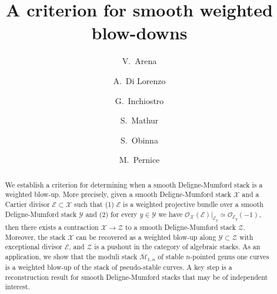 \documentclass{amsart}
\newcommand{\cE}{\mathcal{E}}
\newcommand{\cO}{\mathcal{O}}
\newcommand{\cX}{\mathcal{X}}
\newcommand{\cY}{\mathcal{Y}}
\newcommand{\cZ}{\mathcal{Z}}
\theoremstyle{definition}
\begin{document}
\title{A criterion for smooth weighted blow-downs}
\author[V.~Arena]{V.~Arena}
\address[Veronica Arena]{DPMMS, University of Cambridge, UK}
\author[A.~Di Lorenzo]{A.~Di Lorenzo}
	\address[Andrea Di Lorenzo]{Dipartimento di Matematica, Università di Pisa, Italy}
\author[G.~Inchiostro]{G.~Inchiostro}
	\address[Giovanni Inchiostro]{University of Washington, Seattle, Washington, USA}
\author[S.~Mathur]{S.~Mathur}
\address[Siddharth Mathur]{ University of Georgia, Athens, USA}
\author[S.~Obinna]{S.~Obinna}
\address[Stephen Obinna]{University of Waterloo, Canada}
\author[M.~Pernice]{M.~Pernice}
\address[Michele  Pernice]{University of Washington, Seattle, Washington, USA}
	\maketitle
	\begin{abstract}
		We establish a criterion for determining when a smooth Deligne-Mumford stack is a weighted blow-up. More precisely, given a smooth Deligne-Mumford stack $\cX$ and a Cartier divisor $\cE \subset \cX$ such that (1) $\cE$ is a weighted projective bundle over a smooth Deligne-Mumford stack $\cY$ and (2) for every $y\in\cY$ we have $\cO_{\cX}(\cE)|_{\cE_y}\simeq \cO_{\cE_y}(-1)$, then there exists a contraction $\cX\to\cZ$ to a smooth Deligne-Mumford stack $\cZ$. Moreover, the stack $\cX$ can be recovered as a weighted blow-up along $\cY\subset \cZ$ with exceptional divisor $\cE$, and $\cZ$ is a pushout in the category of algebraic stacks. As an application, we show that the moduli stack $\overline{\mathscr{M}}_{1,n}$ of stable $n$-pointed genus one curves is a weighted blow-up of the stack of pseudo-stable curves. A key step is a reconstruction result for smooth Deligne-Mumford stacks that may be of independent interest. 
	\end{abstract}
 
\end{document}
